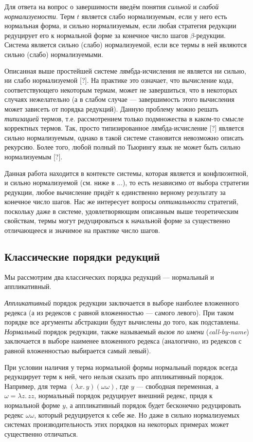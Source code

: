 \documentclass[../diploma.tex]{subfiles}
\begin{document}
Для ответа на вопрос о завершимости введём понятия \textit{сильной} и \textit{слабой нормализуемости}. Терм $t$ является слабо нормализуемым, если у него есть нормальная форма, и сильно нормализуемым, если любая стратегия редукции редуцирует его к нормальной форме за конечное число шагов $\beta$-редукции. Система является сильно (слабо) нормализуемой, если все термы в ней являются сильно (слабо) нормализуемыми.

Описанная выше простейшей системе лямбда-исчисления не является ни сильно, ни слабо нормализуемой [?]. На практике это означает, что вычисление кода, соответствующего некоторым термам, может не завершиться, что в некоторых случаях нежелательно (а в слабом случае --- завершимость этого вычисления может зависеть от порядка редукций). Данную проблему можно решать \textit{типизацией} термов, т.е. рассмотрением только подмножества в каком-то смысле корректных термов. Так, просто типизированное лямбда-исчисление [?] является сильно нормализуемым, однако в такой системе становится невозможно описать рекурсию. Более того, любой полный по Тьюрингу язык не может быть сильно нормализуемым [?].

Данная работа находится в контексте системы, которая является и конфлюэнтной, и сильно нормализуемой (см. ниже в ...), то есть независимо от выбора стратегии редукции, любое вычисление придёт к единственно верному результату за конечное число шагов. Нас же интересует вопросы \textit{оптимальности} стратегий, поскольку даже в системе, удовлетворяющим описанным выше теоретическим свойствам, термы могут редуцироваться к начальной форме за существенно отличающееся и значимое на практике число шагов.

\subsection{Классические порядки редукций}

Мы рассмотрим два классических порядка редукций --- нормальный и аппликативный. 

\textit{Аппликативный} порядок редукции заключается в выборе наиболее вложенного редекса (а из редексов с равной вложенностью --- самого левого). При таком порядке все аргументы абстракции будут вычислены до того, как подставлены. \textit{Нормальный} порядок редукции, также называемый \textit{вызов по имени} (\textit{call-by-name}) заключается в выборе наименее вложенного редекса (аналогично, из редексов с равной вложенностью выбирается самый левый).

При условии наличия у терма нормальной формы нормальный порядок всегда редукцирует терм к ней, чего нельзя сказать про аппликативный порядок. Например, для терма $(\lambda x.\, y) (\omega \omega)$, где $y$ --- свободная переменная, а $\omega = \lambda z.\, z z$, нормальный порядок редуцирует внешний редекс, придя к нормальной форме $y$, а аппликативный порядок будет бесконечно редуцировать редекс $\omega \omega$, который редуцируется к себе же. Но даже в сильно нормализуемых системах производительность этих порядков на некоторых примерах может существенно отличаться.
\end{document}

